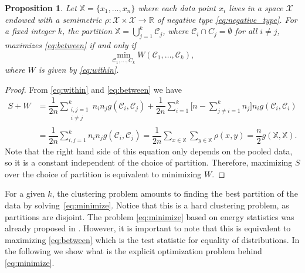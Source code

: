 \documentclass[aps,preprint,nofootinbib,floatfix]{revtex4-1}
\newtheorem{proposition}[theorem]{Proposition}
\newcommand\C{{\mathcal{C}}}
\begin{document}
\begin{proposition}
\label{th:minimize}
Let $\mathbb{X} = \{x_1,\dotsc,x_n\}$ where each data point
$x_i$ lives in a space $\mathcal{X}$ endowed with a semimetric $\rho:
\mathcal{X}\times\mathcal{X} \to \mathbb{R}$ of
negative type \eqref{eq:negative_type}. For a fixed integer $k$,
the partition
$\mathbb{X} = \bigcup_{j=1}^k \C_j$, where $\C_i \cap C_j = \emptyset$ for
all $i\ne j$, maximizes \eqref{eq:between} if and only if
\begin{equation}
\label{eq:minimize}
\min_{\C_1,\dotsc,C_k  } W(
\C_1, \dotsc, \C_k),
\end{equation}
where $W$ is given by \eqref{eq:within}.
\end{proposition}
\begin{proof}
From \eqref{eq:within} and \eqref{eq:between}
we have
\begin{equation}
\begin{split}
S + W &= 
\dfrac{1}{2n} \sum_{\substack{i,j=1 \\ i\ne j}}^k n_i n_j g(\C_i, \C_j)
+ \dfrac{1}{2n} \sum_{i=1}^{k} 
\bigg[ n - 
\sum_{j\ne i = 1}^k n_j \bigg] 
n_i g(\C_i, \C_i) 
\\
& = \dfrac{1}{2n} \sum_{i,j=1}^k n_i n_j g(\C_i, \C_j)
= \dfrac{1}{2n} \sum_{x \in \mathbb{X}} \sum_{y \in \mathbb{X}} \rho(x,y)
= \dfrac{n}{2} g(\mathbb{X}, \mathbb{X}).
\end{split}
\end{equation}
Note that the right hand side of this equation 
only depends on the pooled data, so it is a constant
independent of the choice of partition. Therefore, maximizing
$S$ over the choice of partition is equivalent to minimizing $W$.
\end{proof}

For a given $k$, the clustering problem amounts to
finding the best partition of the data by solving~\eqref{eq:minimize}.
Notice that this is a hard clustering problem, as partitions
are disjoint. The problem \eqref{eq:minimize} based on
energy statistics was already proposed in \cite{Kgroups}. However, it is
important to note that this is equivalent to maximizing \eqref{eq:between}
which is the test statistic for equality of distributions. In the following
we show what is the explicit optimization problem behind \eqref{eq:minimize}.
\end{document}
